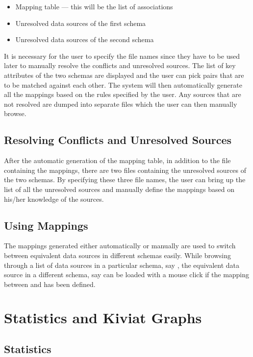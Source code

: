 \begin{itemize}
\item Mapping table --- this will be the list of associations
\item Unresolved data sources of the first schema 
\item Unresolved data sources of the second schema
\end{itemize}

It is necessary for the user to specify the file names since they have
to be used later to manually resolve the conflicts and unresolved
sources. The list of key attributes of the two schemas are displayed
and the user can pick pairs that are to be matched against each other.
The system will then automatically generate all the mappings based on
the rules specified by the user.  Any sources that are not resolved
are dumped into separate files which the user can then manually
browse.

\subsection{Resolving Conflicts and Unresolved Sources}

After the automatic generation of the mapping table, in addition to
the file containing the mappings, there are two files containing the
unresolved sources of the two schemas. By specifying these three file
names, the user can bring up the list of all the unresolved sources
and manually define the mappings based on his/her knowledge of the
sources.

\subsection{Using Mappings}

The mappings generated either automatically or manually are used to
switch between equivalent data sources in different schemas
easily. While browsing through a list of data sources in a particular
schema, say , the equivalent data source in a different
schema, say  can be loaded with a mouse click if the
mapping between  and  has been defined.

\section{Statistics and Kiviat Graphs}

\subsection{Statistics}

